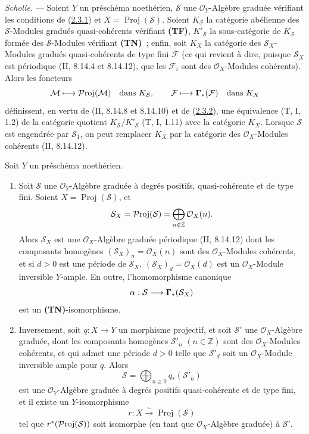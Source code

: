 \begin{env}[2.3.3]
\label{III.2.3.3-fr}
\emph{Scholie.} --- Soient $Y$ un préschéma noethérien, $\mathcal S$ une
$\mathcal O_Y$-Algèbre graduée vérifiant les conditions de
(\hyperref[III.2.3.1-fr]{2.3.1}) et $X=\operatorname{Proj}(\mathcal S)$.
Soient $K_{\mathcal S}$ la catégorie abélienne des $\mathcal S$-Modules
gradués quasi-cohérents vérifiant \textbf{(TF)}, $K'_{\mathcal S}$ la
sous-catégorie de $K_{\mathcal S}$ formée des $\mathcal S$-Modules
vérifiant \textbf{(TN)}~; enfin, soit $K_X$ la catégorie des
$\mathcal S_X$-Modules gradués quasi-cohérents de type fini $\mathcal F$
(ce qui revient à dire, puisque $\mathcal S_X$ est périodique
(II, 8.14.4 et 8.14.12), que les $\mathcal F_i$ sont des
$\mathcal O_X$-Modules cohérents). Alors les foncteurs
\[
\mathcal M\longmapsto\mathcal{P}\mathrm{roj}(\mathcal M)
\quad\text{dans }K_{\mathcal S},
\qquad
\mathcal F\longmapsto\boldsymbol{\Gamma}_*(\mathcal F)
\quad\text{dans }K_X
\]
définissent, en vertu de (II, 8.14.8 et 8.14.10) et de
(\hyperref[III.2.3.2-fr]{2.3.2}), une équivalence (T, I, 1.2) de la
catégorie quotient $K_{\mathcal S}/K'_{\mathcal S}$ (T, I, 1.11) avec la
catégorie $K_X$. Lorsque $\mathcal S$ est engendrée par $\mathcal S_1$,
on peut remplacer $K_X$ par la catégorie des $\mathcal O_X$-Modules
cohérents (II, 8.14.12).
\end{env}

\begin{proposition}[2.3.4]
\label{III.2.3.4-fr}
Soit $Y$ un préschéma noethérien.
\begin{enumerate}
\item[{\rm(i)}] Soit $\mathcal S$ une $\mathcal O_Y$-Algèbre graduée à
degrés positifs, quasi-cohérente et de type fini. Soient
$X=\operatorname{Proj}(\mathcal S)$, et
\[
\mathcal S_X=\mathcal{P}\mathrm{roj}(\mathcal S)
=\bigoplus_{n\in\mathbb Z}\mathcal O_X(n).
\]
Alors $\mathcal S_X$ est une $\mathcal O_X$-Algèbre graduée périodique
(II, 8.14.12) dont les composants homogènes
$(\mathcal S_X)_n=\mathcal O_X(n)$ sont des $\mathcal O_X$-Modules
cohérents, et si $d>0$ est une période de $\mathcal S_X$,
$(\mathcal S_X)_d=\mathcal O_X(d)$ est un $\mathcal O_X$-Module
inversible $Y$-ample. En outre, l'homomorphisme canonique
\[
\alpha:\mathcal S\longrightarrow\boldsymbol{\Gamma}_*(\mathcal S_X)
\]
est un \textbf{(TN)}-isomorphisme.
\item[{\rm(ii)}] Inversement, soit $q:X\to Y$ un morphisme projectif, et
soit $\mathcal S'$ une $\mathcal O_X$-Algèbre graduée, dont les composants
homogènes $\mathcal S'_n$ $(n\in\mathbb Z)$ sont des
$\mathcal O_X$-Modules cohérents, et qui admet une période $d>0$ telle que
$\mathcal S'_d$ soit un $\mathcal O_X$-Module inversible ample pour $q$.
Alors
\[
\mathcal S=\bigoplus_{n\geq0}q_*(\mathcal S'_n)
\]
est une $\mathcal O_Y$-Algèbre graduée à degrés positifs quasi-cohérente
et de type fini, et il existe un $Y$-isomorphisme
\[
r:X\xrightarrow{\sim}\operatorname{Proj}(\mathcal S)
\]
tel que $r^*(\mathcal{P}\mathrm{roj}(\mathcal S))$ soit isomorphe (en tant que
$\mathcal O_X$-Algèbre graduée) à $\mathcal S'$.
\end{enumerate}
\end{proposition}

